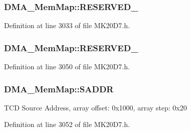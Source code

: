 \subsubsection[{\texorpdfstring{R\+E\+S\+E\+R\+V\+E\+D\+\_\+5}{RESERVED_5}}]{ D\+M\+A\+\_\+\+Mem\+Map\+::\+R\+E\+S\+E\+R\+V\+E\+D\+\_}\hypertarget{struct_d_m_a___mem_map_a1c869e6c7669e7387d83122e15cecfeb}{}\label{struct_d_m_a___mem_map_a1c869e6c7669e7387d83122e15cecfeb}


Definition at line 3033 of file M\+K20\+D7.\+h.

\subsubsection[{\texorpdfstring{R\+E\+S\+E\+R\+V\+E\+D\+\_\+6}{RESERVED_6}}]{ D\+M\+A\+\_\+\+Mem\+Map\+::\+R\+E\+S\+E\+R\+V\+E\+D\+\_}\hypertarget{struct_d_m_a___mem_map_a488d99c6824961121295541ba5dd13b6}{}\label{struct_d_m_a___mem_map_a488d99c6824961121295541ba5dd13b6}


Definition at line 3050 of file M\+K20\+D7.\+h.

\subsubsection[{\texorpdfstring{S\+A\+D\+DR}{SADDR}}]{ D\+M\+A\+\_\+\+Mem\+Map\+::\+S\+A\+D\+DR}\hypertarget{struct_d_m_a___mem_map_a2c0415fb23ffb715629c58275c606f4e}{}\label{struct_d_m_a___mem_map_a2c0415fb23ffb715629c58275c606f4e}
T\+CD Source Address, array offset\+: 0x1000, array step\+: 0x20 

Definition at line 3052 of file M\+K20\+D7.\+h.

